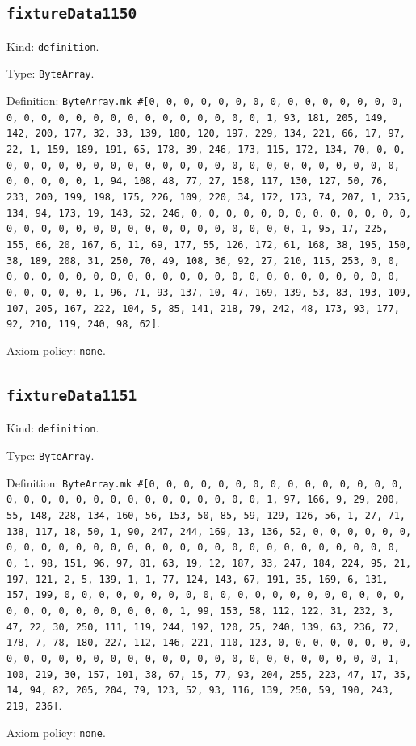 \documentclass[11pt]{article}
\begin{document}
\subsection*{\texttt{fixtureData1150}}
\noindent Kind: \texttt{definition}.\par
\noindent Type: \texttt{ByteArray}.\par
\noindent Definition: \texttt{ByteArray.mk \#[0, 0, 0, 0, 0, 0, 0, 0, 0, 0, 0, 0, 0, 0, 0, 0, 0, 0, 0, 0, 0, 0, 0, 0, 0, 0, 0, 0, 0, 0, 1, 93, 181, 205, 149, 142, 200, 177, 32, 33, 139, 180, 120, 197, 229, 134, 221, 66, 17, 97, 22, 1, 159, 189, 191, 65, 178, 39, 246, 173, 115, 172, 134, 70, 0, 0, 0, 0, 0, 0, 0, 0, 0, 0, 0, 0, 0, 0, 0, 0, 0, 0, 0, 0, 0, 0, 0, 0, 0, 0, 0, 0, 0, 0, 1, 94, 108, 48, 77, 27, 158, 117, 130, 127, 50, 76, 233, 200, 199, 198, 175, 226, 109, 220, 34, 172, 173, 74, 207, 1, 235, 134, 94, 173, 19, 143, 52, 246, 0, 0, 0, 0, 0, 0, 0, 0, 0, 0, 0, 0, 0, 0, 0, 0, 0, 0, 0, 0, 0, 0, 0, 0, 0, 0, 0, 0, 0, 0, 1, 95, 17, 225, 155, 66, 20, 167, 6, 11, 69, 177, 55, 126, 172, 61, 168, 38, 195, 150, 38, 189, 208, 31, 250, 70, 49, 108, 36, 92, 27, 210, 115, 253, 0, 0, 0, 0, 0, 0, 0, 0, 0, 0, 0, 0, 0, 0, 0, 0, 0, 0, 0, 0, 0, 0, 0, 0, 0, 0, 0, 0, 0, 0, 1, 96, 71, 93, 137, 10, 47, 169, 139, 53, 83, 193, 109, 107, 205, 167, 222, 104, 5, 85, 141, 218, 79, 242, 48, 173, 93, 177, 92, 210, 119, 240, 98, 62]}.\par
\noindent Axiom policy: \texttt{none}.\par
\subsection*{\texttt{fixtureData1151}}
\noindent Kind: \texttt{definition}.\par
\noindent Type: \texttt{ByteArray}.\par
\noindent Definition: \texttt{ByteArray.mk \#[0, 0, 0, 0, 0, 0, 0, 0, 0, 0, 0, 0, 0, 0, 0, 0, 0, 0, 0, 0, 0, 0, 0, 0, 0, 0, 0, 0, 0, 0, 1, 97, 166, 9, 29, 200, 55, 148, 228, 134, 160, 56, 153, 50, 85, 59, 129, 126, 56, 1, 27, 71, 138, 117, 18, 50, 1, 90, 247, 244, 169, 13, 136, 52, 0, 0, 0, 0, 0, 0, 0, 0, 0, 0, 0, 0, 0, 0, 0, 0, 0, 0, 0, 0, 0, 0, 0, 0, 0, 0, 0, 0, 0, 0, 1, 98, 151, 96, 97, 81, 63, 19, 12, 187, 33, 247, 184, 224, 95, 21, 197, 121, 2, 5, 139, 1, 1, 77, 124, 143, 67, 191, 35, 169, 6, 131, 157, 199, 0, 0, 0, 0, 0, 0, 0, 0, 0, 0, 0, 0, 0, 0, 0, 0, 0, 0, 0, 0, 0, 0, 0, 0, 0, 0, 0, 0, 0, 0, 1, 99, 153, 58, 112, 122, 31, 232, 3, 47, 22, 30, 250, 111, 119, 244, 192, 120, 25, 240, 139, 63, 236, 72, 178, 7, 78, 180, 227, 112, 146, 221, 110, 123, 0, 0, 0, 0, 0, 0, 0, 0, 0, 0, 0, 0, 0, 0, 0, 0, 0, 0, 0, 0, 0, 0, 0, 0, 0, 0, 0, 0, 0, 0, 1, 100, 219, 30, 157, 101, 38, 67, 15, 77, 93, 204, 255, 223, 47, 17, 35, 14, 94, 82, 205, 204, 79, 123, 52, 93, 116, 139, 250, 59, 190, 243, 219, 236]}.\par
\noindent Axiom policy: \texttt{none}.\par
\end{document}
